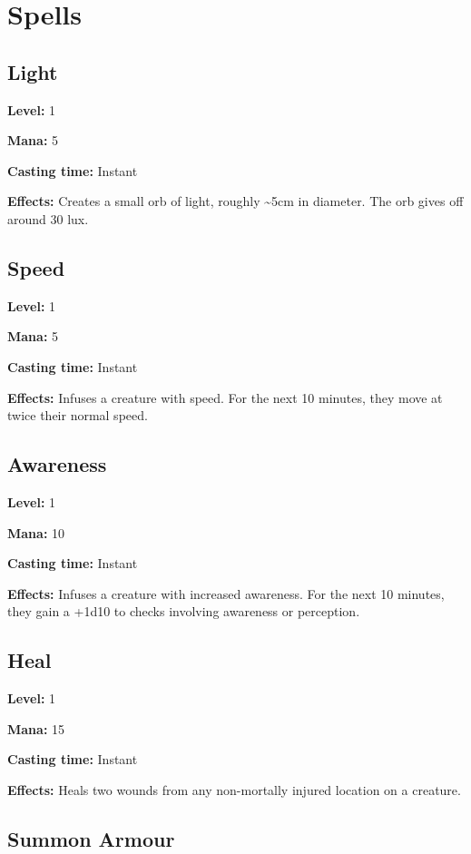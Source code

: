 \documentclass[]{article}
\date{}
\begin{document}
\section{Spells}\label{spells}

\subsection{Light}\label{light}

\textbf{Level:} 1

\textbf{Mana:} 5

\textbf{Casting time:} Instant

\textbf{Effects:} Creates a small orb of light, roughly
\textasciitilde{}5cm in diameter. The orb gives off around 30 lux.

\subsection{Speed}\label{speed}

\textbf{Level:} 1

\textbf{Mana:} 5

\textbf{Casting time:} Instant

\textbf{Effects:} Infuses a creature with speed. For the next 10
minutes, they move at twice their normal speed.

\subsection{Awareness}\label{awareness}

\textbf{Level:} 1

\textbf{Mana:} 10

\textbf{Casting time:} Instant

\textbf{Effects:} Infuses a creature with increased awareness. For the
next 10 minutes, they gain a +1d10 to checks involving awareness or
perception.

\subsection{Heal}\label{heal}

\textbf{Level:} 1

\textbf{Mana:} 15

\textbf{Casting time:} Instant

\textbf{Effects:} Heals two wounds from any non-mortally injured
location on a creature.

\subsection{Summon Armour}\label{summon-armour}
\end{document}
